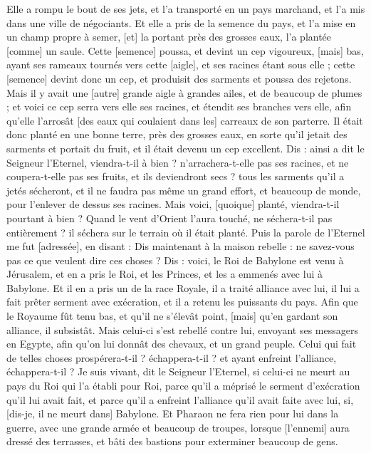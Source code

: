 \begin{multicols}{2}
Elle a rompu le bout de ses jets, et l'a transporté en un pays marchand, et l'a mis dans une ville de négociants.
Et elle a pris de la semence du pays, et l'a mise en un champ propre à semer, [et] la portant près des grosses eaux, l'a plantée [comme] un saule.
Cette [semence] poussa, et devint un cep vigoureux, [mais] bas, ayant ses rameaux tournés vers cette [aigle], et ses racines étant sous elle ; cette [semence] devint donc un cep, et produisit des sarments et poussa des rejetons.
Mais il y avait une [autre] grande aigle à grandes ailes, et de beaucoup de plumes ; et voici ce cep serra vers elle ses racines, et étendit ses branches vers elle, afin qu'elle l'arrosât [des eaux qui coulaient dans les] carreaux de son parterre.
Il était donc planté en une bonne terre, près des grosses eaux, en sorte qu'il jetait des sarments et portait du fruit, et il était devenu un cep excellent.
Dis : ainsi a dit le Seigneur l'Eternel, viendra-t-il à bien ? n'arrachera-t-elle pas ses racines, et ne coupera-t-elle pas ses fruits, et ils deviendront secs ? tous les sarments qu'il a jetés sécheront, et il ne faudra pas même un grand effort, et beaucoup de monde, pour l'enlever de dessus ses racines.
Mais voici, [quoique] planté, viendra-t-il pourtant à bien ? Quand le vent d'Orient l'aura touché, ne séchera-t-il pas entièrement ? il séchera sur le terrain où il était planté.
Puis la parole de l'Eternel me fut [adressée], en disant :
Dis maintenant à la maison rebelle : ne savez-vous pas ce que veulent dire ces choses ? Dis : voici, le Roi de Babylone est venu à Jérusalem, et en a pris le Roi, et les Princes, et les a emmenés avec lui à Babylone.
Et il en a pris un de la race Royale, il a traité alliance avec lui, il lui a fait prêter serment avec exécration, et il a retenu les puissants du pays.
Afin que le Royaume fût tenu bas, et qu'il ne s'élevât point, [mais] qu'en gardant son alliance, il subsistât.
Mais celui-ci s'est rebellé contre lui, envoyant ses messagers en Egypte, afin qu'on lui donnât des chevaux, et un grand peuple. Celui qui fait de telles choses prospérera-t-il ? échappera-t-il ? et ayant enfreint l'alliance, échappera-t-il ?
Je suis vivant, dit le Seigneur l'Eternel, si celui-ci ne meurt au pays du Roi qui l'a établi pour Roi, parce qu'il a méprisé le serment d'exécration qu'il lui avait fait, et parce qu'il a enfreint l'alliance qu'il avait faite avec lui, si, [dis-je, il ne meurt dans] Babylone.
Et Pharaon ne fera rien pour lui dans la guerre, avec une grande armée et beaucoup de troupes, lorsque [l'ennemi] aura dressé des terrasses, et bâti des bastions pour exterminer beaucoup de gens.

\end{multicols}
